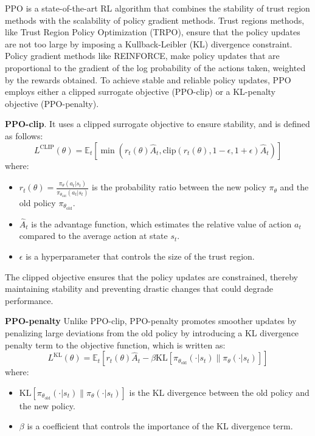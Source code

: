 \gls{PPO} is a state-of-the-art \gls{RL} algorithm that combines the stability of trust region methods with the scalability of policy gradient methods.
Trust regions methods, like Trust Region Policy Optimization (TRPO), ensure that the policy updates are not too large by imposing a Kullback-Leibler (KL) divergence constraint.
Policy gradient methods like REINFORCE, make policy updates that are proportional to the gradient of the log probability of the actions taken, weighted by the rewards obtained.
To achieve stable and reliable policy updates, \gls{PPO} employs either a clipped surrogate objective (PPO-clip) or a KL-penalty objective (PPO-penalty).

\textbf{PPO-clip}. It uses a clipped surrogate objective to ensure stability, and is defined as follows:
\[
L^{\text{CLIP}}(\theta) = \mathbb{E}_t \left[ \min \left( r_t(\theta) \hat{A}_t, \text{clip}(r_t(\theta), 1 - \epsilon, 1 + \epsilon) \hat{A}_t \right) \right]
\]
where:
\begin{itemize}
    \item $r_t(\theta) = \frac{\pi_{\theta}(a_t|s_t)}{\pi_{\theta_{\text{old}}}(a_t|s_t)}$ is the probability ratio between the new policy $\pi_{\theta}$ and the old policy $\pi_{\theta_{\text{old}}}$.
    \item $\hat{A}_t$ is the advantage function, which estimates the relative value of action $a_t$ compared to the average action at state $s_t$.
    \item $\epsilon$ is a hyperparameter that controls the size of the trust region.
\end{itemize}

The clipped objective ensures that the policy updates are constrained, thereby maintaining stability and preventing drastic changes that could degrade performance.

\textbf{PPO-penalty} Unlike PPO-clip, PPO-penalty promotes smoother updates by penalizing large deviations from the old policy by introducing a KL divergence penalty term to the objective function, which is written as:
\[
L^{\text{KL}}(\theta) = \mathbb{E}_t \left[ r_t(\theta) \hat{A}_t - \beta \text{KL}[\pi_{\theta_{\text{old}}}(\cdot|s_t) \| \pi_{\theta}(\cdot|s_t)] \right]
\]
where:
\begin{itemize}
    \item $\text{KL}[\pi_{\theta_{\text{old}}}(\cdot|s_t) \| \pi_{\theta}(\cdot|s_t)]$ is the KL divergence between the old policy and the new policy.
    \item $\beta$ is a coefficient that controls the importance of the KL divergence term.
\end{itemize}

